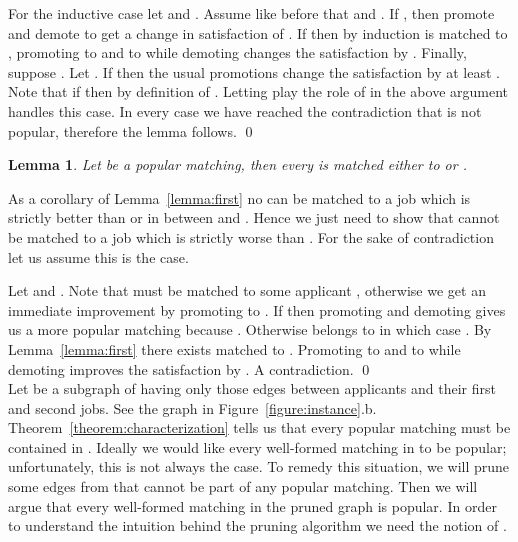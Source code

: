 \documentclass[11pt]{article}
\newcommand{\second}{s}
\newtheorem{lemma}{Lemma}
\begin{document}
{For the inductive case let  and . Assume like before that  and . If , then promote  and demote  to get a change in satisfaction of . If  then by induction  is matched to , promoting  to  and   to  while demoting  changes the satisfaction by . Finally, suppose . Let . If  then the usual promotions change the satisfaction by at least . Note that if  then  by definition of . Letting  play the role of  in the above argument handles this case.
In every case we have reached the contradiction that  is not popular, therefore the lemma follows.
\qed \\

\begin{lemma} \label{lemma:second} Let  be a popular matching, then every  is matched either to  or .
\end{lemma}

\begin{floatingfigure}[r]{3.75cm}
\vspace{1ex}0.35cm]
 \rput[r](-0.25,0){y}  &  \rput[l](0.25,0){\second(x) = p } \7em]
\end{array}
\ncline{-}{z}{fy}
\ncline[linestyle=dashed,dash=4pt 2pt,arrowinset=0.2]{->}{y}{fy}
\ncline{-}{y}{p}
\ncline[linestyle=dashed,dash=4pt 2pt,arrowinset=0.2]{->}{x}{p}
\end{floatingfigure}

\myproof
As a corollary of Lemma~\ref{lemma:first} no  can be matched to a job which is strictly better than  or in between  and . Hence we just need to show that  cannot be matched to a job which is strictly worse than . For the sake of contradiction let us assume this is the case.


Let  and . Note that  must be matched to some applicant , otherwise we get an immediate improvement by promoting  to . If  then promoting  and demoting  gives us a more popular matching because . Otherwise  belongs to  in which case . By Lemma~\ref{lemma:first} there exists  matched to . Promoting  to  and  to  while demoting  improves the satisfaction by . A contradiction.
\qed \\

Let  be a subgraph of  having only those edges between applicants and their first and second jobs. See the graph in Figure~\ref{figure:instance}.b. Theorem~\ref{theorem:characterization} tells us that every popular matching must be contained in . Ideally we would like every well-formed matching in  to be popular; unfortunately, this is not always the case. To remedy this situation, we will prune some edges from  that cannot be part of any popular matching. Then we will argue that every well-formed matching in the pruned graph is popular. In order to understand the intuition behind the pruning algorithm we need the notion of .

}
\end{document}
